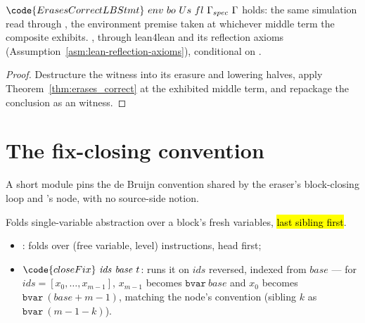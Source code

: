 \begin{theorem}
\label{thm:erases_correct_lb}
\leanok
{}
 $\code{ErasesCorrectLBStmt}\ env\ bo\ Us\ fl\ \Gamma_{spec}\ \Gamma$ holds: the same
simulation read through \hl{}, the environment premise taken at whichever middle term the
composite exhibits.
 \stProved{}, \stInherited{} through lean4lean and its reflection axioms
(Assumption~\ref{asm:lean-reflection-axioms}), conditional on \stAssumed{} .
\end{theorem}
\begin{proof}
\leanok
{}
 Destructure the  witness into its erasure and lowering halves, apply
Theorem~\ref{thm:erases_correct} at the exhibited middle term, and repackage the conclusion as an
 witness.
\end{proof}

\section{The fix-closing convention}
\label{sec:correctness:closefix}

A short module pins the de Bruijn convention shared by the eraser's block-closing loop and \lbox{}'s
 node, with no source-side notion.

\begin{definition}
\label{def:closeFix}
\leanok
{}
 Folds single-variable abstraction over a block's fresh variables, \hl{last sibling
first}.
\begin{itemize}
\item {}: folds  over (free variable, level) instructions, head first;
\item $\code{closeFix}\ \mathit{ids}\ \mathit{base}\ t$: runs it on $\mathit{ids}$ reversed, indexed from
$\mathit{base}$ --- for $\mathit{ids} = [x_0,\dots,x_{m-1}]$, $x_{m-1}$ becomes
$\mathtt{bvar}\ \mathit{base}$ and $x_0$ becomes $\mathtt{bvar}\ (\mathit{base}+m-1)$, matching the
\lbox{}  node's convention (sibling $k$ as $\mathtt{bvar}\ (m-1-k)$).
\end{itemize}
\end{definition}


